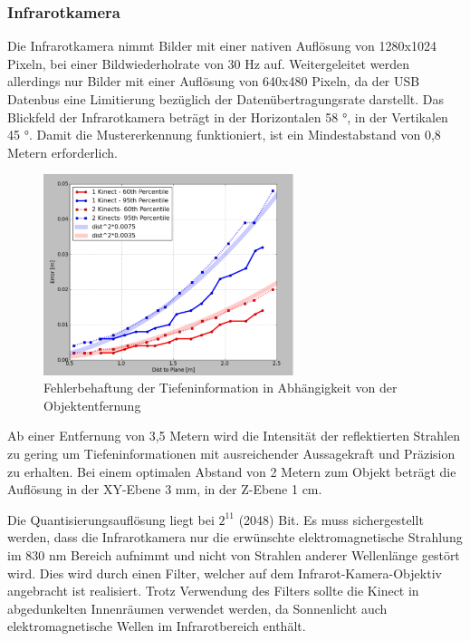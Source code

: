 \subsubsection{Infrarotkamera}
Die Infrarotkamera nimmt Bilder mit einer nativen Auflösung von 1280x1024 Pixeln, bei einer Bildwiederholrate von 30 Hz auf. Weitergeleitet werden allerdings nur Bilder mit einer Auflösung von 640x480 Pixeln, da der USB Datenbus eine Limitierung bezüglich der Datenübertragungsrate darstellt. Das Blickfeld der Infrarotkamera beträgt in der Horizontalen 58 °, in der Vertikalen 45 °. Damit die Mustererkennung funktioniert, ist ein Mindestabstand von 0,8 Metern erforderlich. \\
 \begin{figure}[!ht]
 	\begin{center}
 		\includegraphics[width=0.65\textwidth]{./Res/Res_to_Dist}
 	\end{center}
 	\caption{Fehlerbehaftung  der Tiefeninformation in Abhängigkeit von der Objektentfernung}
 	\label{fig:Res_to_Dist}
 \end{figure}
 
 Ab einer Entfernung von 3,5 Metern wird die Intensität der reflektierten Strahlen zu gering um Tiefeninformationen mit ausreichender Aussagekraft und Präzision zu erhalten.
Bei einem optimalen Abstand von 2 Metern zum Objekt beträgt die Auflösung 
in der XY-Ebene 3 mm, in der Z-Ebene 1 cm.





Die Quantisierungsauflösung liegt bei $2^ {11}$ (2048) Bit.
Es muss sichergestellt werden, dass die Infrarotkamera nur die erwünschte elektromagnetische Strahlung im 830 nm Bereich aufnimmt und nicht von Strahlen anderer Wellenlänge gestört wird. Dies wird durch einen Filter, welcher auf dem Infrarot-Kamera-Objektiv angebracht ist realisiert.
Trotz Verwendung des Filters sollte die Kinect in abgedunkelten Innenräumen verwendet werden, da Sonnenlicht auch elektromagnetische Wellen im Infrarotbereich enthält.

